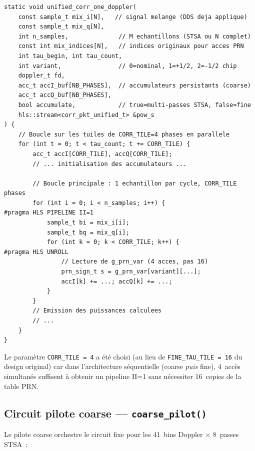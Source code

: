 \documentclass[11pt,a4paper]{article}
\begin{document}
\begin{lstlisting}[caption={Structure du circuit fixe unifié}]
static void unified_corr_one_doppler(
    const sample_t mix_i[N],   // signal melange (DDS deja applique)
    const sample_t mix_q[N],
    int n_samples,              // M echantillons (STSA ou N complet)
    const int mix_indices[N],   // indices originaux pour acces PRN
    int tau_begin, int tau_count,
    int variant,                // 0=nominal, 1=+1/2, 2=-1/2 chip
    doppler_t fd,
    acc_t accI_buf[NB_PHASES],  // accumulateurs persistants (coarse)
    acc_t accQ_buf[NB_PHASES],
    bool accumulate,            // true=multi-passes STSA, false=fine
    hls::stream<corr_pkt_unified_t> &pow_s
) {
    // Boucle sur les tuiles de CORR_TILE=4 phases en parallele
    for (int t = 0; t < tau_count; t += CORR_TILE) {
        acc_t accI[CORR_TILE], accQ[CORR_TILE];
        // ... initialisation des accumulateurs ...

        // Boucle principale : 1 echantillon par cycle, CORR_TILE phases
        for (int i = 0; i < n_samples; i++) {
#pragma HLS PIPELINE II=1
            sample_t bi = mix_i[i];
            sample_t bq = mix_q[i];
            for (int k = 0; k < CORR_TILE; k++) {
#pragma HLS UNROLL
                // Lecture de g_prn_var (4 acces, pas 16)
                prn_sign_t s = g_prn_var[variant][...];
                accI[k] += ...; accQ[k] += ...;
            }
        }
        // Emission des puissances calculees
        // ...
    }
}
\end{lstlisting}

Le paramètre \texttt{CORR\_TILE~=~4} a été choisi (au lieu de \texttt{FINE\_TAU\_TILE~=~16} du design original) car dans l'architecture séquentielle (coarse \textit{puis} fine), 4~accès simultanés suffisent à obtenir un pipeline II=1 sans nécessiter 16~copies de la table PRN.

\subsection{Circuit pilote coarse --- \texttt{coarse\_pilot()}}

Le pilote coarse orchestre le circuit fixe pour les 41~bins Doppler $\times$ 8~passes STSA~:
\end{document}
